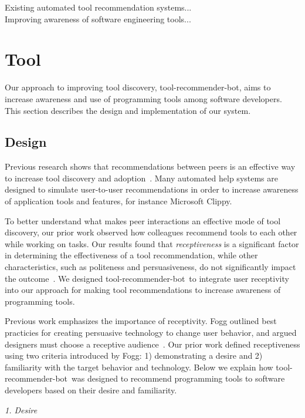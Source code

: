 \documentclass[conference]{IEEEtran}
\newcommand{\tool}{tool-recommender-bot}
\newcommand{\pseudosection}[1]{\vspace{2mm} \noindent {\bf #1}}
\newcommand{\pseudosubsection}[1]{\vspace{2mm} {\it #1}}
\begin{document}
Existing automated tool recommendation systems...\\

Improving awareness of software engineering tools...\\

\section{Tool}
Our approach to improving tool discovery, \tool, aims to increase awareness and use of programming tools among software developers. This section describes the design and implementation of our system.

\subsection{Design}
Previous research shows that recommendations between peers is an effective way to increase tool discovery and adoption~\cite{Murphy-HillPeerInteraction}. Many automated help systems are designed to simulate user-to-user recommendations in order to increase awareness of application tools and features, for instance Microsoft Clippy\cite{Clippy}. 

To better understand what makes peer interactions an effective mode of tool discovery, our prior work observed how colleagues recommend tools to each other while working on tasks. Our results found that \emph{receptiveness} is a significant factor in determining the effectiveness of a tool recommendation, while other characteristics, such as politeness and persuasiveness, do not significantly impact the outcome~\cite{vlhcc17}. We designed \tool~to integrate user receptivity into our approach for making tool recommendations to increase awareness of programming tools.

\pseudosection{Receptiveness}

Previous work emphasizes the importance of receptivity. Fogg outlined best practicies for creating persuasive technology to change user behavior, and argued designers must choose a receptive audience~\cite{FoggPersuasive}. Our prior work defined receptiveness using two criteria introduced by Fogg: 1) demonstrating a desire and 2) familiarity with the target behavior and technology. Below we explain how \tool~was designed to recommend programming tools to software developers based on their desire and familiarity.

\pseudosubsection{1. Desire}
\end{document}
